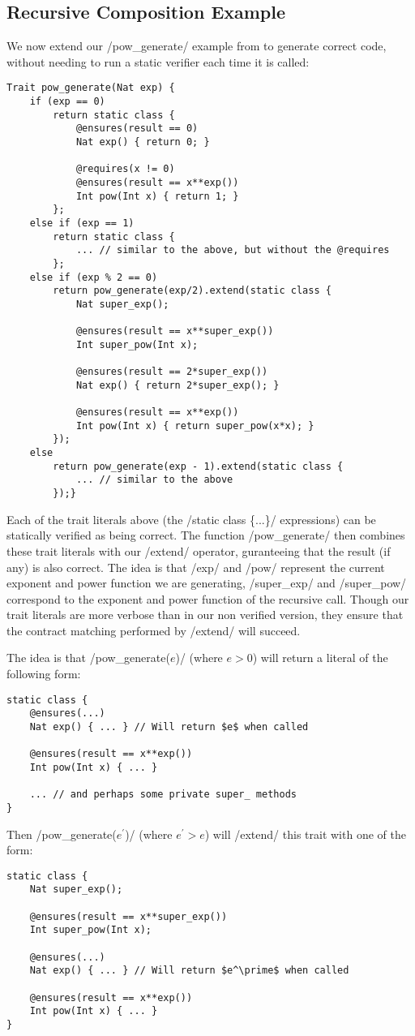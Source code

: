 \subsection{Recursive Composition Example}
We now extend our /pow_generate/ example from  to generate correct code, without needing to run a static verifier each time it is called:
\begin{lstlisting}
Trait pow_generate(Nat exp) {
	if (exp == 0)
		return static class { 
			@ensures(result == 0)
			Nat exp() { return 0; }

			@requires(x != 0)
			@ensures(result == x**exp())
			Int pow(Int x) { return 1; }
		};
	else if (exp == 1)
		return static class {
			... // similar to the above, but without the @requires
		};
	else if (exp % 2 == 0)
		return pow_generate(exp/2).extend(static class {
			Nat super_exp();

			@ensures(result == x**super_exp())
			Int super_pow(Int x);
			
			@ensures(result == 2*super_exp())
			Nat exp() { return 2*super_exp(); }

			@ensures(result == x**exp())
			Int pow(Int x) { return super_pow(x*x); }
		});
	else 
		return pow_generate(exp - 1).extend(static class {
			... // similar to the above
		});}
\end{lstlisting}

Each of the trait literals above (the /static class \{...\}/ expressions) can be statically verified as being correct. The function /pow_generate/ then combines these trait literals with our /extend/ operator, guranteeing that the result (if any) is also correct. The idea is that /exp/ and /pow/ represent the current exponent and power function we are generating, /super_exp/ and /super_pow/ correspond to the exponent and power function of the recursive call. Though our trait literals are more verbose than in our non verified version, they ensure that the contract matching performed by /extend/ will succeed. 

The idea is that /pow_generate($e$)/ (where $e > 0$) will return a literal of the following form:
\begin{lstlisting}
static class {
	@ensures(...)
	Nat exp() { ... } // Will return $e$ when called

	@ensures(result == x**exp())
	Int pow(Int x) { ... }
	
	... // and perhaps some private super_ methods
}
\end{lstlisting}
Then /pow_generate($e^\prime$)/ (where $e^\prime > e$) will /extend/ this trait with one of the form:
\begin{lstlisting}
static class {
	Nat super_exp();

	@ensures(result == x**super_exp())
	Int super_pow(Int x);
	
	@ensures(...)
	Nat exp() { ... } // Will return $e^\prime$ when called

	@ensures(result == x**exp())
	Int pow(Int x) { ... }
}
\end{lstlisting}


